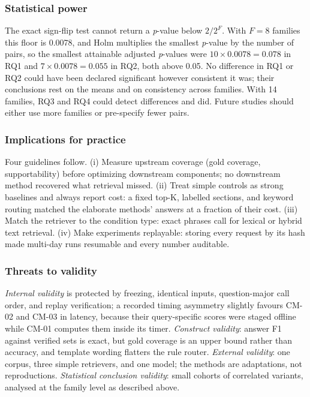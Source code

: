 \documentclass[conference]{IEEEtran}
\begin{document}
\subsubsection{Statistical power}

The exact sign-flip test cannot return a \emph{p}-value below $2/2^F$. With $F=8$ families this floor is 0.0078, and Holm multiplies the smallest \emph{p}-value by the number of pairs, so the smallest attainable adjusted \emph{p}-values were $10\times 0.0078=0.078$ in RQ1 and $7\times 0.0078=0.055$ in RQ2, both above 0.05. No difference in RQ1 or RQ2 could have been declared significant however consistent it was; their conclusions rest on the means and on consistency across families. With 14 families, RQ3 and RQ4 could detect differences and did. Future studies should either use more families or pre-specify fewer pairs.

\subsubsection{Implications for practice}

Four guidelines follow. (i) Measure upstream coverage (gold coverage, supportability) before optimizing downstream components; no downstream method recovered what retrieval missed. (ii) Treat simple controls as strong baselines and always report cost: a fixed top-K, labelled sections, and keyword routing matched the elaborate methods' answers at a fraction of their cost. (iii) Match the retriever to the condition type: exact phrases call for lexical or hybrid text retrieval. (iv) Make experiments replayable: storing every request by its hash made multi-day runs resumable and every number auditable.

\subsubsection{Threats to validity}

\emph{Internal validity} is protected by freezing, identical inputs, question-major call order, and replay verification; a recorded timing asymmetry slightly favours CM-02 and CM-03 in latency, because their query-specific scores were staged offline while CM-01 computes them inside its timer. \emph{Construct validity}: answer F1 against verified sets is exact, but gold coverage is an upper bound rather than accuracy, and template wording flatters the rule router. \emph{External validity}: one corpus, three simple retrievers, and one model; the methods are adaptations, not reproductions. \emph{Statistical conclusion validity}: small cohorts of correlated variants, analysed at the family level as described above.
\end{document}
